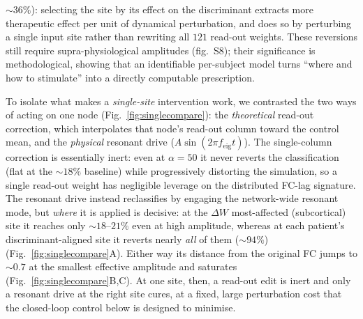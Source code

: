 \documentclass[11pt]{article}
\begin{document}
$\sim$$36\%$): selecting the site by its effect on the discriminant extracts more
therapeutic effect per unit of dynamical perturbation, and does so by perturbing
a single input site rather than rewriting all $121$ read-out weights. These
reversions still require supra-physiological amplitudes (fig.~S8); their
significance is methodological, showing that an identifiable per-subject model
turns ``where and how to stimulate'' into a directly computable prescription.

To isolate what makes a \emph{single-site} intervention work, we contrasted the
two ways of acting on one node (Fig.~\ref{fig:singlecompare}): the
\emph{theoretical} read-out correction, which interpolates that node's read-out
column toward the control mean, and the \emph{physical} resonant drive
($A\sin(2\pi f_{\mathrm{eig}}t)$). The single-column correction is essentially
inert: even at $\alpha=50$ it never reverts the classification (flat at the
$\sim$$18\%$ baseline) while progressively distorting the simulation, so a single
read-out weight has negligible leverage on the distributed FC-lag signature. The
resonant drive instead reclassifies by engaging the network-wide resonant mode,
but \emph{where} it is applied is decisive: at the $\Delta W$ most-affected
(subcortical) site it reaches only $\sim$$18$--$21\%$ even at high amplitude,
whereas at each patient's discriminant-aligned site it reverts nearly \emph{all} of them ($\sim$$94\%$)
(Fig.~\ref{fig:singlecompare}A). Either way its distance from the original FC
jumps to $\sim$$0.7$ at the smallest effective amplitude and saturates
(Fig.~\ref{fig:singlecompare}B,C). At one site, then, a read-out edit is inert
and only a resonant drive at the right site cures, at a fixed, large perturbation
cost that the closed-loop control below is designed to minimise.
\end{document}

